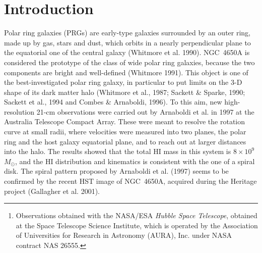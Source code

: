 \documentclass[preprint]{aastex}
\begin{document}
\begin{abstract}

This work presents new surface photometry and two-dimensional 
modeling of the light distribution of the Polar Ring Galaxy NGC~4650A, 
based on near-infrared (NIR) observations and high resolution 
optical imaging acquired during the Hubble 
Heritage\footnote{Observations obtained 
with the NASA/ESA {\it Hubble Space Telescope},
obtained at the Space Telescope Science Institute, which is operated by 
the Association of Universities for Research in Astronomy (AURA), Inc. 
under NASA contract NAS 26555.} program.

The NIR and optical integrated colors of the S0 and the polar ring,
and their scale parameters, are compared with those for standard galaxy
morphological types. The polar structure appears to 
be a disk of a very young age, while the colors and light 
distribution of the host galaxy do not resemble that of a 
typical early-type system.
We compare these observational results with the predictions from
different formation scenarios for polar ring galaxies.  The
peculiarities of the central S0 galaxy, the polar disk structure and
stellar population ages suggest that the polar ring galaxy NGC~4650A
may be the result of a dissipative merger event, rather than of an
accretion process.           
\end{abstract}                                                                


\section{Introduction}\label{intro}
Polar ring galaxies (PRGs) are early-type galaxies
surrounded by an outer ring, made up by gas, stars and dust, which
orbits in a nearly perpendicular plane to the equatorial one of the
central galaxy (Whitmore et al. 1990).
NGC~4650A is considered the prototype of the class of wide polar ring
galaxies, because the two components are bright and well-defined
(Whitmore 1991). 
This object is one of the best-investigated polar ring galaxy, 
in particular to put limits on the 3-D shape of its dark matter 
halo (Whitmore et al., 1987; Sackett \& Sparke, 1990; 
Sackett et al., 1994 and Combes \& Arnaboldi, 1996). 
To this aim, new high-resolution 21-cm observations
were carried out by Arnaboldi et al. in 1997 at the Australia 
Telescope Compact Array. These were meant to resolve the rotation
curve at small radii, where velocities were measured
into two planes, the polar ring and the host galaxy equatorial plane, 
and to reach out at larger distances into the halo.
The results showed that the total HI mass in this system is 
$8 \times 10^{9}$ $M_{\odot}$, and the HI distribution and kinematics 
is consistent with the one of a spiral disk.
The spiral pattern proposed by Arnaboldi et al. (1997) seems to be
confirmed by the recent HST image of NGC~4650A, acquired during the
Heritage project (Gallagher et al. 2001).
\end{document}
